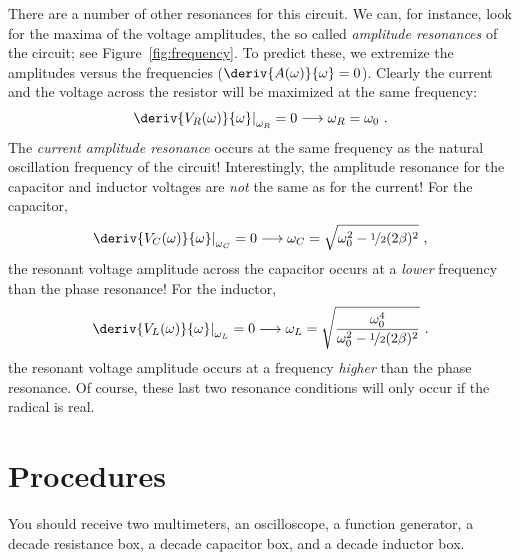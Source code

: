 \documentclass[12pt]{article}
\begin{document}
There are a number of other resonances for this circuit.  We can, for
instance, look for the maxima of the voltage amplitudes, the so called
\textit{amplitude resonances} of the circuit; see
Figure~\ref{fig:frequency}.  To predict these, we extremize the
amplitudes versus the frequencies ($\deriv{A(\omega)}{\omega} = 0$).
Clearly the current and the voltage across the resistor will be
maximized at the same frequency:
\begin{gather*}
  \left.\deriv{V_R(\omega)}{\omega}\right|_{\omega_R} = 0
  \longrightarrow \omega_R = \omega_0\ .
\end{gather*}
The \textit{current amplitude resonance} occurs at the same
frequency as the natural oscillation frequency of the circuit!
Interestingly, the amplitude resonance for the capacitor and inductor
voltages are \textit{not} the same as for the current!  For the
capacitor,
\begin{gather*}
  \left.\deriv{V_C(\omega)}{\omega}\right|_{\omega_C} = 0 
  \longrightarrow \omega_C = \sqrt{\omega_0^2 -
      \nicefrac{1}{2}(2\beta)^2}\ ,
\end{gather*}
the resonant voltage amplitude across the capacitor occurs at a
\textit{lower} frequency than the phase resonance!  For the inductor,
\begin{gather*}
  \left.\deriv{V_L(\omega)}{\omega}\right|_{\omega_L} = 0 
  \longrightarrow \omega_L = \sqrt{
      \frac{\omega_0^4}{\omega_0^2 - \nicefrac{1}{2}(2\beta)^2}
    }\ .
\end{gather*}
the resonant voltage amplitude occurs at a frequency \textit{higher}
than the phase resonance.  Of course, these last two resonance
conditions will only occur if the radical is real.

\section{Procedures}
\label{sec:procedures}

You should receive two multimeters, an oscilloscope, a function
generator, a decade resistance box, a decade capacitor box, and a
decade inductor box.
\end{document}
